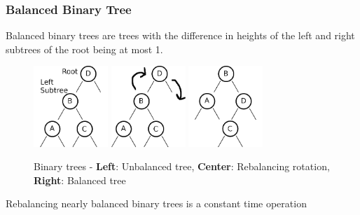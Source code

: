 \documentclass{beamer}
\begin{document}
\begin{frame}
  \frametitle{Balanced Binary Tree}
  Balanced binary trees are trees with the difference in heights of the left and right subtrees
  of the root being at most 1.
  \begin{figure}[ht]
    \begin{multicols}{3}
      \includegraphics[width=0.25\textwidth]{figures/unbalanced_binary_tree.png}
      \includegraphics[width=0.25\textwidth]{figures/unbalanced_binary_tree_rotation.png}
      \includegraphics[width=0.25\textwidth]{figures/balanced_binary_tree.png}
    \end{multicols}
    \caption{Binary trees - {\bf Left}: Unbalanced tree, {\bf Center}: Rebalancing rotation,
      {\bf Right}: Balanced tree}
  \end{figure}
  Rebalancing nearly balanced binary trees is a constant time operation
\end{frame}
\end{document}
